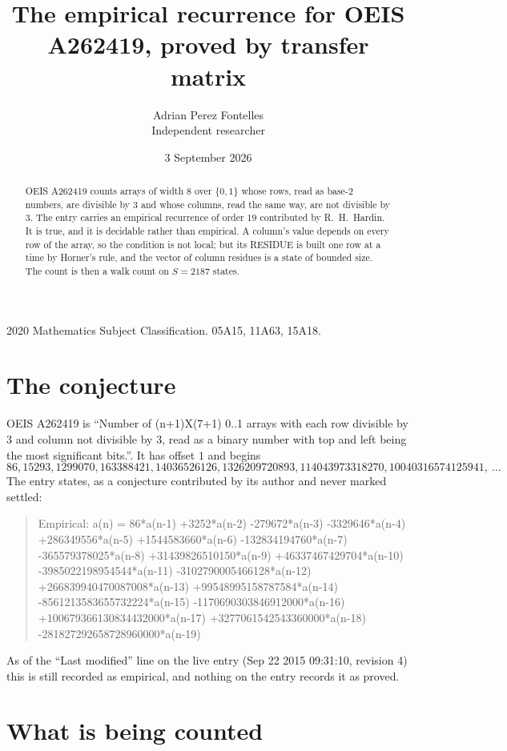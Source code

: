 \documentclass[11pt,a4paper]{article}
\title{The empirical recurrence for OEIS A262419, proved by transfer matrix}
\author{Adrian Perez Fontelles\\ \small Independent researcher}
\date{3 September 2026}
\theoremstyle{plain}
\theoremstyle{definition}
\begin{document}
\maketitle

\begin{abstract}
OEIS A262419 counts arrays of width $8$ over $\{0,1\}$ whose rows, read as base-$2$
numbers, are divisible by $3$ and whose columns, read the same way, are not divisible by
$3$. The entry carries an empirical recurrence of order $19$ contributed by
R.~H.~Hardin. It is true, and it is decidable rather than empirical. A column's value depends on
every row of the array, so the condition is not local; but its RESIDUE is built one row at a
time by Horner's rule, and the vector of column residues is a state of bounded size. The count
is then a walk count on $S=2187$ states.
\end{abstract}

\noindent\small 2020 Mathematics Subject Classification. 05A15, 11A63, 15A18.\normalsize

\section{The conjecture}

OEIS A262419 is ``Number of (n+1)X(7+1) 0..1 arrays with each row divisible by 3 and column not divisible by 3, read as a binary number with top and left being the most significant bits.''. It has offset $1$ and begins
\[
86, 15293, 1299070, 163388421, 14036526126, 1326209720893, 114043973318270, 10040316574125941,\ \dots
\]
The entry states, as a conjecture contributed by its author and never marked settled:
\begin{quote}
Empirical: a(n) = 86*a(n-1) +3252*a(n-2) -279672*a(n-3) -3329646*a(n-4) +286349556*a(n-5) +1544583660*a(n-6) -132834194760*a(n-7) -365579378025*a(n-8) +31439826510150*a(n-9) +46337467429704*a(n-10) -3985022198954544*a(n-11) -3102790005466128*a(n-12) +266839940470087008*a(n-13) +99548995158787584*a(n-14) -8561213583655732224*a(n-15) -1170690303846912000*a(n-16) +100679366130834432000*a(n-17) +3277061542543360000*a(n-18) -281827292658728960000*a(n-19)
\end{quote}
As of the ``Last modified'' line on the live entry (Sep 22 2015 09:31:10, revision 4) this is still
recorded as empirical, and nothing on the entry records it as proved.

\section{What is being counted}
\end{document}
